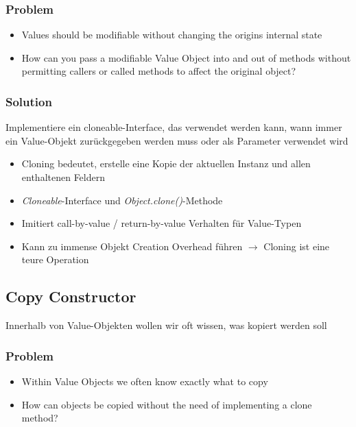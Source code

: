 \subsubsection{Problem}
\begin{itemize}
    \item Values should be modifiable without changing the origins internal state
    \item How can you pass a modifiable Value Object into and out of methods without permitting callers or called methods to affect the original object?
\end{itemize}

\subsubsection{Solution}
Implementiere ein cloneable-Interface, das verwendet werden kann, wann immer ein Value-Objekt zurückgegeben werden muss oder als Parameter verwendet wird

\begin{itemize}
    \item Cloning bedeutet, erstelle eine Kopie der aktuellen Instanz und allen enthaltenen Feldern
    \item \textit{Cloneable}-Interface und \textit{Object.clone()}-Methode
    \item Imitiert call-by-value / return-by-value Verhalten für Value-Typen
    \item Kann zu immense Objekt Creation Overhead führen $\rightarrow$ Cloning ist eine teure Operation
\end{itemize}

\subsection{Copy Constructor}

Innerhalb von Value-Objekten wollen wir oft wissen, was kopiert werden soll

\subsubsection{Problem}
\begin{itemize}
    \item Within Value Objects we often know exactly what to copy
    \item How can objects be copied without the need of implementing a clone method?
\end{itemize}

